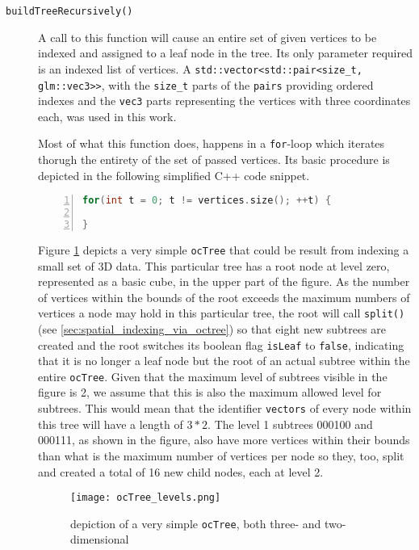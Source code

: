 \begin{description}
	\item[\texttt{buildTreeRecursively()}] A call to this function will cause an entire set of given vertices to be indexed and assigned to a leaf node in the tree. Its only parameter required is an indexed list of vertices. A \texttt{std::vector<std::pair<size\_t, glm::vec3>>}, with the \texttt{size\_t} parts of the \texttt{pairs} providing ordered indexes and the \texttt{vec3} parts representing the vertices with three coordinates each, was used in this work.


	Most of what this function does, happens in a \texttt{for}-loop which iterates thorugh the entirety of the set of passed vertices. Its basic procedure is depicted in the following simplified C++ code snippet.

\begin{lstlisting}[language=C++,numberstyle=\zebra{black!5}{white}{},numbers=left,xleftmargin=2em]
for(int t = 0; t != vertices.size(); ++t) {
	
}
\end{lstlisting}

Figure \ref{fig:ocTree_levels.png} depicts a very simple \texttt{ocTree} that could be result from indexing a small set of 3D data. This particular tree has a root node at level zero, represented as a basic cube, in the upper part of the figure. As the number of vertices within the bounds of the root exceeds the maximum numbers of vertices a node may hold in this particular tree, the root will call \texttt{split()} (see \ref{sec:spatial_indexing_via_octree}) so that eight new subtrees are created and the root switches its boolean flag \texttt{isLeaf} to \texttt{false}, indicating that it is no longer a leaf node but the root of an actual subtree within the entire \texttt{ocTree}. Given that the maximum level of subtrees visible in the figure is 2, we assume that this is also the maximum allowed level for subtrees. This would mean that the identifier \texttt{vectors} of every node within this tree will have a length of $3*2$. The level 1 subtrees 000100 and 000111, as shown in the figure, also have more vertices within their bounds than what is the maximum number of vertices per node so they, too, split and created a total of 16 new child nodes, each at level 2.

\begin{figure}[htb]
  \centering
  \texttt{[image: ocTree\_levels.png]}\\ %
  \caption{depiction of a very simple \texttt{ocTree}, both three- and two-dimensional}\label{fig:ocTree_levels.png}
\end{figure}


\end{description} %
 

